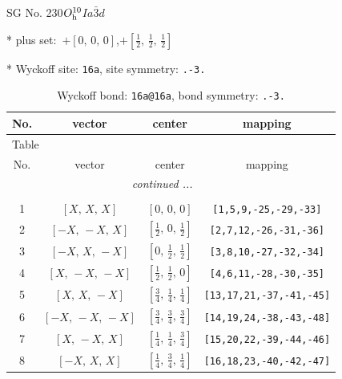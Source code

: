 \documentclass[fleqn,8pt]{jsarticle}
\begin{document}
\setcounter{MaxMatrixCols}{32}

\renewcommand{\tablename}{Table~}
\renewcommand{\figurename}{Figure~}
\begin{center}
\LARGE
SG No. 230\quad$O_{\rm h}^{10}$\quad$Ia\bar{3}d$\quad[ cubic ]
\end{center}

* plus set:\,\,\,$+\left[ 0,\, 0,\, 0 \right]$,\quad $+\left[ \frac{1}{2},\, \frac{1}{2},\, \frac{1}{2} \right]$


* Wyckoff site: {\tt 16a}, site symmetry: {\tt .-3.}
\renewcommand{\arraystretch}{1.2}
\begin{longtable}{cccc}
\caption{Wyckoff bond: {\tt 16a@16a}, bond symmetry: {\tt .-3.}}
 \\
 \hline \hline
No. & vector & center & mapping \\ \hline \endfirsthead

\multicolumn{3}{l}{\tablename\ \thetable{}} \\
 \hline \hline
No. & vector & center & mapping \\ \hline \endhead

 \hline \hline
\multicolumn{3}{r}{\footnotesize\it continued ...} \\ \endfoot

 \hline \hline
\multicolumn{3}{r}{} \\ \endlastfoot

1 & $\left[ X,\, X,\, X \right]$ & $\left[ 0,\, 0,\, 0 \right]$ & {\tt [1,5,9,-25,-29,-33]} \\ \hline
2 & $\left[ - X,\, - X,\, X \right]$ & $\left[ \frac{1}{2},\, 0,\, \frac{1}{2} \right]$ & {\tt [2,7,12,-26,-31,-36]} \\ \hline
3 & $\left[ - X,\, X,\, - X \right]$ & $\left[ 0,\, \frac{1}{2},\, \frac{1}{2} \right]$ & {\tt [3,8,10,-27,-32,-34]} \\ \hline
4 & $\left[ X,\, - X,\, - X \right]$ & $\left[ \frac{1}{2},\, \frac{1}{2},\, 0 \right]$ & {\tt [4,6,11,-28,-30,-35]} \\ \hline
5 & $\left[ X,\, X,\, - X \right]$ & $\left[ \frac{3}{4},\, \frac{1}{4},\, \frac{1}{4} \right]$ & {\tt [13,17,21,-37,-41,-45]} \\ \hline
6 & $\left[ - X,\, - X,\, - X \right]$ & $\left[ \frac{3}{4},\, \frac{3}{4},\, \frac{3}{4} \right]$ & {\tt [14,19,24,-38,-43,-48]} \\ \hline
7 & $\left[ X,\, - X,\, X \right]$ & $\left[ \frac{1}{4},\, \frac{1}{4},\, \frac{3}{4} \right]$ & {\tt [15,20,22,-39,-44,-46]} \\ \hline
8 & $\left[ - X,\, X,\, X \right]$ & $\left[ \frac{1}{4},\, \frac{3}{4},\, \frac{1}{4} \right]$ & {\tt [16,18,23,-40,-42,-47]} \\
\end{longtable}
\end{document}
